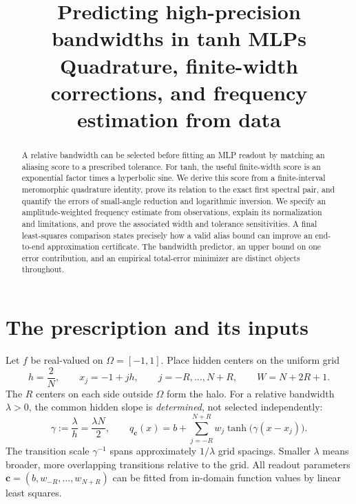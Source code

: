 \documentclass[11pt]{article}
\title{Predicting high-precision bandwidths in tanh MLPs\\[4pt]
\large Quadrature, finite-width corrections, and frequency estimation from data}
\author{}\date{}
\theoremstyle{definition}\newtheorem{definition}[theorem]{Definition}
\theoremstyle{remark}\newtheorem{remark}[theorem]{Remark}
\numberwithin{equation}{section}
\begin{document}
\maketitle\vspace{-2.5em}
\begin{abstract}
A relative bandwidth can be selected before fitting an MLP readout by matching an aliasing score to a prescribed tolerance. For tanh, the useful finite-width score is an exponential factor times a hyperbolic sine. We derive this score from a finite-interval meromorphic quadrature identity, prove its relation to the exact first spectral pair, and quantify the errors of small-angle reduction and logarithmic inversion. We specify an amplitude-weighted frequency estimate from observations, explain its normalization and limitations, and prove the associated width and tolerance sensitivities. A final least-squares comparison states precisely how a valid alias bound can improve an end-to-end approximation certificate. The bandwidth predictor, an upper bound on one error contribution, and an empirical total-error minimizer are distinct objects throughout.
\end{abstract}

\section{The prescription and its inputs}
\label{sec:setup}
Let $f$ be real-valued on $\Omega=[-1,1]$. Place hidden centers on the uniform grid
\begin{equation}
 h=\frac2N,\qquad x_j=-1+jh,\qquad j=-R,\ldots,N+R,
 \qquad W=N+2R+1.
 \label{eq:geometry}
\end{equation}
The $R$ centers on each side outside $\Omega$ form the halo. For a relative bandwidth $\lambda>0$, the common hidden slope is \emph{determined}, not selected independently:
\begin{equation}
 \gamma:=\frac{\lambda}{h}=\frac{\lambda N}{2},\qquad
 q_{\mathbf c}(x)=b+\sum_{j=-R}^{N+R}w_j\tanh\bigl(\gamma(x-x_j)\bigr).
 \label{eq:mlp}
\end{equation}
The transition scale $\gamma^{-1}$ spans approximately $1/\lambda$ grid spacings. Smaller $\lambda$ means broader, more overlapping transitions relative to the grid. All readout parameters $\mathbf c=(b,w_{-R},\ldots,w_{N+R})$ can be fitted from in-domain function values by linear least squares.
\end{document}
